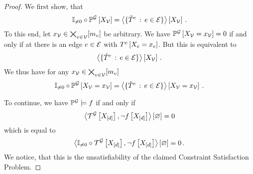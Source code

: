 \begin{proof}
	We first show, that
	\begin{align*}
		\nonzerofunction\circ\probofat{\graph}{\nodevariables} =
		\contractionof{\{\sechypercoreof{\edge} \, : \, \edge\in\edges \}}{\nodevariables} \, . %
	\end{align*}
	To this end, let $x_{\mathcal{V}}\in\bigtimes_{v\in\mathcal{V}}[m_{v}]$ be arbitrary.
	We have $\mathbb{P}^{\mathcal{G}}\left[X_{\mathcal{V}}=x_{\mathcal{V}}\right]=0$ if and only if at there is an edge $e\in\mathcal{E}$ with $T^{e}\left[X_{e}=x_{e}\right]$.
	But this is equivalent to
	\begin{align*}
		\left\langle \{\tilde{T}^{e} \, : \, e\in\mathcal{E} \}\right\rangle \left[ X_{\mathcal{V}} \right] \, .
	\end{align*}
	We thus have for any $x_{\mathcal{V}}\in\bigtimes_{v\in\mathcal{V}}[m_{v}]$
	\begin{align*}
		\nonzerofunction\circ\probofat{\graph}{\indexednodevariables} =
		\contractionof{\{\sechypercoreof{\edge} \, : \, \edge\in\edges \}}{\indexednodevariables} \, . %
	\end{align*}

	To continue, we have $\mathbb{P}^{\mathcal{G}}\models f$ if and only if
	\begin{align*}
		\left\langle \mathcal{T}^{\mathcal{G}}\left[X_{[d]}\right],\lnot f\left[X_{[d]}\right]\right\rangle \left[ \varnothing \right] = 0
	\end{align*}
	which is equal to
	\begin{align*}
		\left\langle \mathbb{I}_{\neq0}\circ\mathcal{T}^{\mathcal{G}}\left[X_{[d]}\right],\lnot f\left[X_{[d]}\right]\right\rangle \left[ \varnothing \right] = 0 \, .
	\end{align*}
	We notice, that this is the unsatisfiability of the claimed Constraint Satisfaction Problem.

\end{proof}

